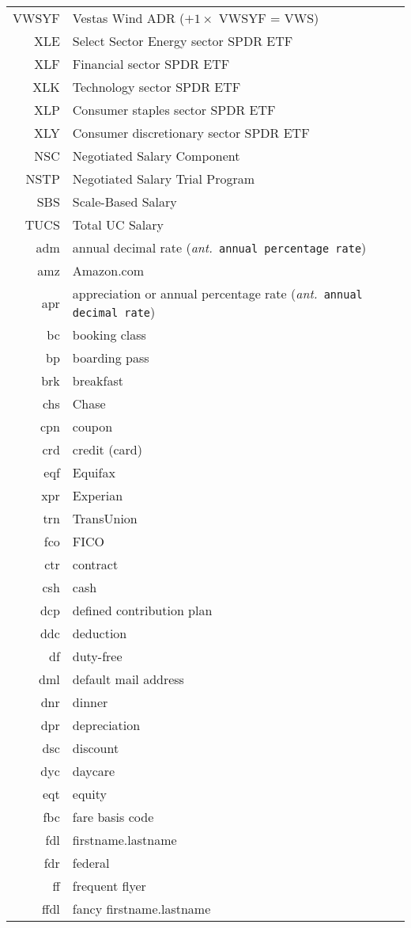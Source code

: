 \documentclass[12pt,twoside]{article}
\newcommand{\ant}[1]{(\textit{ant.}~\texttt{#1})}
\begin{document}
\begin{longtable}[>{\bfseries}l]{>{\ttfamily}r l}
VWSYF & Vestas Wind ADR ($+1 \times$ VWSYF = VWS) \\
XLE & Select Sector Energy sector SPDR ETF \\
XLF & Financial sector SPDR ETF \\
XLK & Technology sector SPDR ETF \\
XLP & Consumer staples sector SPDR ETF \\
XLY & Consumer discretionary sector SPDR ETF \\
NSC & Negotiated Salary Component \\
NSTP & Negotiated Salary Trial Program \\
SBS & Scale-Based Salary \\
TUCS & Total UC Salary \\
adm & annual decimal rate \ant{annual percentage rate} \\
amz & Amazon.com \\
apr & appreciation or annual percentage rate \ant{annual decimal rate} \\
bc & booking class \\
bp & boarding pass \\
brk & breakfast \\
chs & Chase \\
cpn & coupon \\
crd & credit (card) \\
eqf & Equifax \\
xpr & Experian \\
trn & TransUnion \\
fco & FICO \\
ctr & contract \\
csh & cash \\
dcp & defined contribution plan \\
ddc & deduction \\
df & duty-free \\
dml & default mail address \\
dnr & dinner \\
dpr & depreciation \\
dsc & discount \\
dyc & daycare \\
eqt & equity \\
fbc & fare basis code \\
fdl & firstname.lastname \\
fdr & federal \\
ff & frequent flyer \\
ffdl & fancy firstname.lastname \\

\end{longtable}
\end{document}
